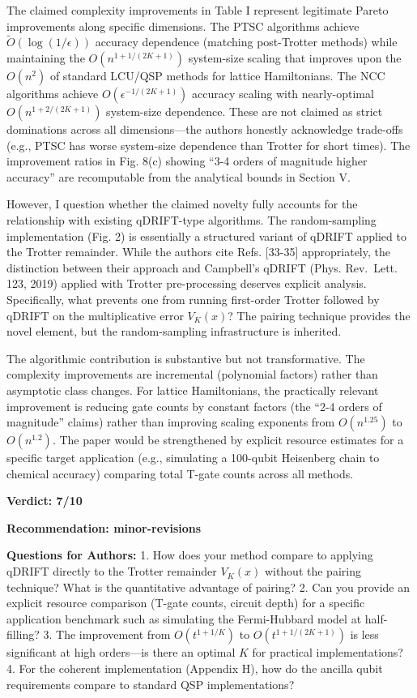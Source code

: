 \documentclass[10pt,letterpaper]{article}
\begin{document}
The claimed complexity improvements in Table I represent legitimate Pareto improvements along specific dimensions. The PTSC algorithms achieve \(\tilde{O}(\log(1/\epsilon))\) accuracy dependence (matching post-Trotter methods) while maintaining the \(O(n^{1+1/(2K+1)})\) system-size scaling that improves upon the \(O(n^2)\) of standard LCU/QSP methods for lattice Hamiltonians. The NCC algorithms achieve \(O(\epsilon^{-1/(2K+1)})\) accuracy scaling with nearly-optimal \(O(n^{1+2/(2K+1)})\) system-size dependence. These are not claimed as strict dominations across all dimensions---the authors honestly acknowledge trade-offs (e.g., PTSC has worse system-size dependence than Trotter for short times). The improvement ratios in Fig. 8(c) showing ``3-4 orders of magnitude higher accuracy'' are recomputable from the analytical bounds in Section V.

However, I question whether the claimed novelty fully accounts for the relationship with existing qDRIFT-type algorithms. The random-sampling implementation (Fig. 2) is essentially a structured variant of qDRIFT applied to the Trotter remainder. While the authors cite Refs. {[}33-35{]} appropriately, the distinction between their approach and Campbell's qDRIFT (Phys. Rev.~Lett. 123, 2019) applied with Trotter pre-processing deserves explicit analysis. Specifically, what prevents one from running first-order Trotter followed by qDRIFT on the multiplicative error \(V_K(x)\)? The pairing technique provides the novel element, but the random-sampling infrastructure is inherited.

The algorithmic contribution is substantive but not transformative. The complexity improvements are incremental (polynomial factors) rather than asymptotic class changes. For lattice Hamiltonians, the practically relevant improvement is reducing gate counts by constant factors (the ``2-4 orders of magnitude'' claims) rather than improving scaling exponents from \(O(n^{1.25})\) to \(O(n^{1.2})\). The paper would be strengthened by explicit resource estimates for a specific target application (e.g., simulating a 100-qubit Heisenberg chain to chemical accuracy) comparing total T-gate counts across all methods.

\textbf{Verdict: 7/10}

\textbf{Recommendation: minor-revisions}

\textbf{Questions for Authors:}
1. How does your method compare to applying qDRIFT directly to the Trotter remainder \(V_K(x)\) without the pairing technique? What is the quantitative advantage of pairing?
2. Can you provide an explicit resource comparison (T-gate counts, circuit depth) for a specific application benchmark such as simulating the Fermi-Hubbard model at half-filling?
3. The improvement from \(O(t^{1+1/K})\) to \(O(t^{1+1/(2K+1)})\) is less significant at high orders---is there an optimal \(K\) for practical implementations?
4. For the coherent implementation (Appendix H), how do the ancilla qubit requirements compare to standard QSP implementations?
\end{document}
